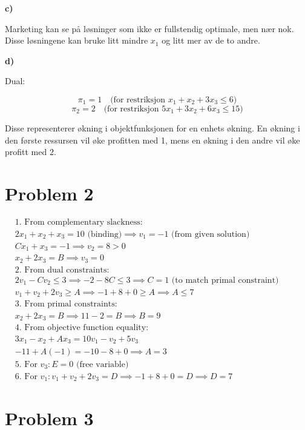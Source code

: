 \documentclass{article}
\begin{document}
\vspace*{12pt}\small\textbf{c)}

Marketing kan se på løsninger som ikke er fullstendig optimale, men nær nok. Disse løsningene kan bruke litt mindre $x_1$ og litt mer av de to andre.

\vspace*{12pt}\small\textbf{d)}

Dual:

\[
    \pi_1 = 1 \quad \text{(for restriksjon } x_1 + x_2 + 3x_3 \leq 6 \text{)}
\]
\[
    \pi_2 = 2 \quad \text{(for restriksjon } 5x_1 + 3x_2 + 6x_3 \leq 15 \text{)}
\]

Disse representerer økning i objektfunksjonen for en enhets økning. En økning i den første ressursen vil øke profitten med 1, mens en økning i den andre vil øke profitt med 2.

\section*{\textbf{Problem 2}}

$\begin{aligned}
& \text{1. From complementary slackness:} \\
& 2x_1 + x_2 + x_3 = 10 \text{ (binding)} \implies v_1 = -1 \text{ (from given solution)} \\
& Cx_1 + x_3 = -1 \implies v_2 = 8 > 0 \\
& x_2 + 2x_3 = B \implies v_3 = 0 \\
& \text{2. From dual constraints:} \\
& 2v_1 - Cv_2 \leq 3 \implies -2 - 8C \leq 3 \implies C = 1 \text{ (to match primal constraint)} \\
& v_1 + v_2 + 2v_3 \geq A \implies -1 + 8 + 0 \geq A \implies A \leq 7 \\
& \text{3. From primal constraints:} \\
& x_2 + 2x_3 = B \implies 11 - 2 = B \implies B = 9 \\
& \text{4. From objective function equality:} \\
& 3x_1 - x_2 + Ax_3 = 10v_1 - v_2 + 5v_3 \\
& -11 + A(-1) = -10 - 8 + 0 \implies A = 3 \\
& \text{5. For } v_3: E = 0 \text{ (free variable)} \\
& \text{6. For } v_1: v_1 + v_2 + 2v_3 = D \implies -1 + 8 + 0 = D \implies D = 7
\end{aligned}$

\section*{\textbf{Problem 3}}
\end{document}
